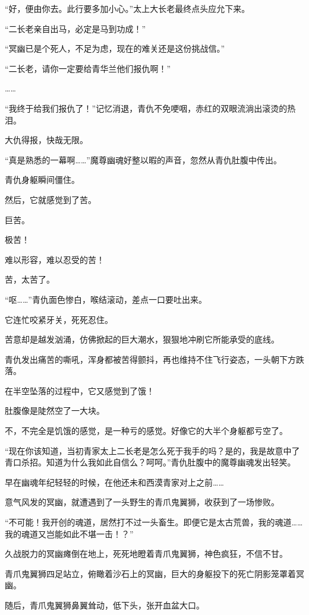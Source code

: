 \begin{this_body}
“好，便由你去。此行要多加小心。”太上大长老最终点头应允下来。

“二长老亲自出马，必定是马到功成！”

“冥幽已是个死人，不足为虑，现在的难关还是这份挑战信。”

“二长老，请你一定要给青华兰他们报仇啊！”

……

“我终于给我们报仇了！”记忆消退，青仇不免哽咽，赤红的双眼流淌出滚烫的热泪。

大仇得报，快哉无限。

“真是熟悉的一幕啊……”魔尊幽魂好整以暇的声音，忽然从青仇肚腹中传出。

青仇身躯瞬间僵住。

然后，它就感觉到了苦。

巨苦。

极苦！

难以形容，难以忍受的苦！

苦，太苦了。

“呕……”青仇面色惨白，喉结滚动，差点一口要吐出来。

它连忙咬紧牙关，死死忍住。

苦意却是越发汹涌，仿佛掀起的巨大潮水，狠狠地冲刷它所能承受的底线。

青仇发出痛苦的嘶吼，浑身都被苦得颤抖，再也维持不住飞行姿态，一头朝下方跌落。

在半空坠落的过程中，它又感觉到了饿！

肚腹像是陡然空了一大块。

不，不完全是饥饿的感觉，是一种亏的感觉。好像它的大半个身躯都亏空了。

“现在你该知道，当初青家太上二长老是怎么死于我手的吗？是的，我是故意中了青口杀招。知道为什么我如此自信么？呵呵。”青仇肚腹中的魔尊幽魂发出轻笑。

早在幽魂年纪轻轻的时候，在他还未和西漠青家对上之前……

意气风发的冥幽，就遭遇到了一头野生的青爪鬼翼狮，收获到了一场惨败。

“不可能！我开创的魂道，居然打不过一头畜生。即便它是太古荒兽，我的魂道……我的魂道又岂能如此不堪一击！？”

久战脱力的冥幽瘫倒在地上，死死地瞪着青爪鬼翼狮，神色疯狂，不信不甘。

青爪鬼翼狮四足站立，俯瞰着沙石上的冥幽，巨大的身躯投下的死亡阴影笼罩着冥幽。

随后，青爪鬼翼狮鼻翼耸动，低下头，张开血盆大口。


\end{this_body}
